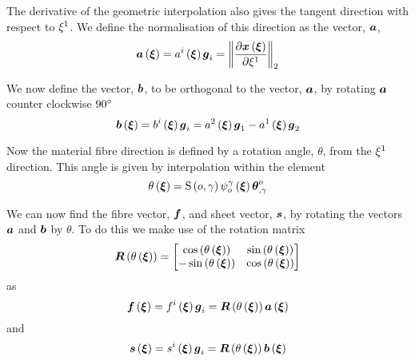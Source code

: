 The derivative of the geometric interpolation also gives the tangent
direction with respect to $\xi^{1}$. We define the normalisation of
this direction as the vector, $ \boldsymbol{a} $, \ie
\begin{equation}
    \boldsymbol{a} \left(  \boldsymbol{\xi}  \right) = a^{i}\left(  \boldsymbol{\xi}  \right)   \boldsymbol{ g }  _{i}= {\left\|  \dfrac{\partial   \boldsymbol{x} \left(  \boldsymbol{\xi}  \right) }{\partial \xi^{1}}  \right\|_{2}} 
\end{equation}

We now define the vector, $ \boldsymbol{b} $, to be orthogonal to the vector, $ \boldsymbol{a} $, by rotating $ \boldsymbol{a} $ counter clockwise
$90^{\circ}$ \ie
\begin{equation}
    \boldsymbol{b} \left(  \boldsymbol{\xi}  \right) = b^{i}\left(  \boldsymbol{\xi}  \right)   \boldsymbol{ g }  _{i}=
   a^{2}\left(  \boldsymbol{\xi}  \right)   \boldsymbol{ g }  _{1}- a^{1}\left(  \boldsymbol{\xi}  \right)   \boldsymbol{ g }  _{2}
\end{equation}

Now the material fibre direction is defined by a rotation angle,
$\theta$, from the $\xi^{1}$ direction. This angle is given by
interpolation within the element \ie
\begin{equation}
   \theta\left(  \boldsymbol{\xi}  \right) =   \mathrm{S} \left( o,\gamma \right)     \psi_{o}^{\gamma} \left(  \boldsymbol{\xi}  \right)    { \boldsymbol{\theta} }^{o} _{,\gamma} 
\end{equation}

We can now find the fibre vector, $ \boldsymbol{f} $, and sheet vector,
$ \boldsymbol{s} $, by rotating the vectors $ \boldsymbol{a} $ and $ \boldsymbol{b} $ by
$\theta$. To do this we make use of the rotation matrix
\begin{equation}
  \fnof{\matr{R}}{\fnof{\theta}{\vectr{\xi}}}=\begin{bmatrix}
  \cosine{\fnof{\theta}{\vectr{\xi}}} & \sine{\fnof{\theta}{\vectr{\xi}}} \\
  -\sine{\fnof{\theta}{\vectr{\xi}}} & \cosine{\fnof{\theta}{\vectr{\xi}}}
  \end{bmatrix}
\end{equation}
as
\begin{equation}
  \fnof{\vectr{f}}{\vectr{\xi}}=\fnof{f^{i}}{\vectr{\xi}}\generalbasevector_{i}=\fnof{\matr{R}}{\fnof{\theta}{\vectr{\xi}}}\fnof{\vectr{a}}{\vectr{\xi}}
\end{equation}
and
\begin{equation}
  \fnof{\vectr{s}}{\vectr{\xi}}=\fnof{s^{i}}{\vectr{\xi}}\generalbasevector_{i}=\fnof{\matr{R}}{\fnof{\theta}{\vectr{\xi}}}\fnof{\vectr{b}}{\vectr{\xi}}
\end{equation}
  
